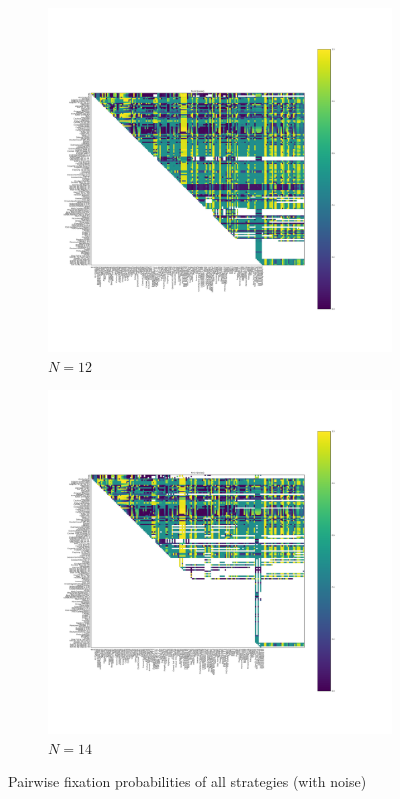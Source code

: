 \documentclass{article}
\begin{document}
\begin{figure}[!hbtp]
\begin{subfigure}[t]{.3\textwidth}
        \centering
        \includegraphics[width=.8\textwidth]{../img/fixation_heatmap_12_noise.pdf}
        \caption{\(N=12\)}
    \end{subfigure}%

    \begin{subfigure}[t]{.3\textwidth}
        \centering
        \includegraphics[width=.8\textwidth]{../img/fixation_heatmap_14_noise.pdf}
        \caption{\(N=14\)}
    \end{subfigure}%
    \caption{Pairwise fixation probabilities of all strategies (with noise)}
    \label{fig:fixation_heatmap_std}
\end{figure}
\end{document}
